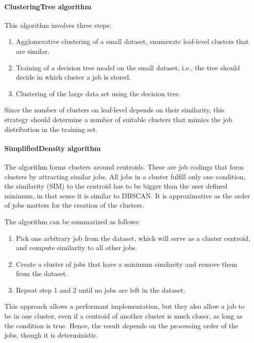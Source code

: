 \documentclass[]{llncs}
\begin{document}
\paragraph{ClusteringTree algorithm}
This algorithm involves three steps:

\begin{enumerate}
 \item Agglomerative clustering of a small dataset, enumerate leaf-level clusters that are similar.
 \item Training of a decision tree model on the small dataset, i.e., the tree should decide in which cluster a job is stored.
 \item Clustering of the large data set using the decision tree.
\end{enumerate}

Since the number of clusters on leaf-level depends on their similarity, this strategy should determine a number of suitable clusters that mimics the job distribution in the training set.

\paragraph{SimplifiedDensity algorithm}

The algorithm forms clusters around centroids.
These are job codings that form clusters by attracting similar jobs.
All jobs in a cluster fulfill only one condition, the similarity (SIM) to the centroid has to be bigger than the user defined minimum, in that sense it is similar to DBSCAN.
It is approximative as the order of jobs matters for the creation of the clusters.

The algorithm can be summarized as follows:
\begin{enumerate}
 \item Pick one arbitrary job from the dataset, which will serve as a cluster centroid, and compute similarity to all other jobs.
 \item Create a cluster of jobs that have a minimum similarity and remove them from the dataset.
 \item Repeat step 1 and 2 until no jobs are left in the dataset.
\end{enumerate}

This approach allows a performant implementation, but they also allow a job to be in one cluster, even if a centroid of another cluster is much closer, as long as the condition is true.
Hence, the result depends on the processing order of the jobs, though it is deterministic.
\end{document}
